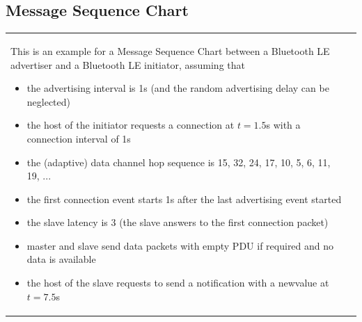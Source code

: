 	\subsection{Message Sequence Chart}
		\begin{tabular}{ll}
			\parbox{12cm}{
				This is an example for a Message Sequence Chart between a Bluetooth LE advertiser and a Bluetooth LE initiator, assuming that 
				\begin{itemize}
					\item the advertising interval is 1s (and the random advertising delay can be neglected)  
					\item the host of the initiator requests a connection at $t = 1.5$s with a connection interval of 1s  
					\item the (adaptive) data channel hop sequence is 15, 32, 24, 17, 10, 5, 6, 11, 19, ...  
					\item the first connection event starts 1s after the last advertising event started  
					\item the slave latency is 3 (the slave answers to the first connection packet)  
					\item master and slave send data packets with empty PDU if required and no data is available   
					\item the host of the slave requests to send a notification with a newvalue at $t = 7.5$s 
				\end{itemize}
			}
			& \parbox{6cm}{
			}	
		\end{tabular}
			
			
			